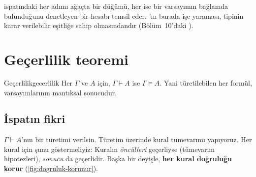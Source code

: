 \noindent \Lean{} ispatındaki her  adımı ağaçta bir
düğümü, her  ise bir varsayımın bağlamda bulunduğunu
denetleyen bir hesabı temsil eder. 'ın burada işe yaraması,
 tipinin karar verilebilir eşitliğe sahip olmasındandır
(Bölüm~10'daki  ).

\section{Geçerlilik teoremi}\label{sec:gecerlilik-teoremi}

\begin{teorem}{Geçerlilik}{gecerlilik}
Her $\Gamma$ ve $A$ için, $\Gamma \vdash A$ ise $\Gamma \models A$.
Yani türetilebilen her formül, varsayımlarının mantıksal sonucudur.
\end{teorem}

\subsection{İspatın fikri}

$\Gamma \vdash A$'nın bir türetimi verilsin. Türetim üzerinde kural
tümevarımı yapıyoruz. Her kural için şunu göstermeliyiz: Kuralın
\emph{öncülleri} geçerliyse (tümevarım hipotezleri), \emph{sonucu} da
geçerlidir. Başka bir deyişle, \textbf{her kural doğruluğu korur}
(\cref{fig:dogruluk-korunur}).

